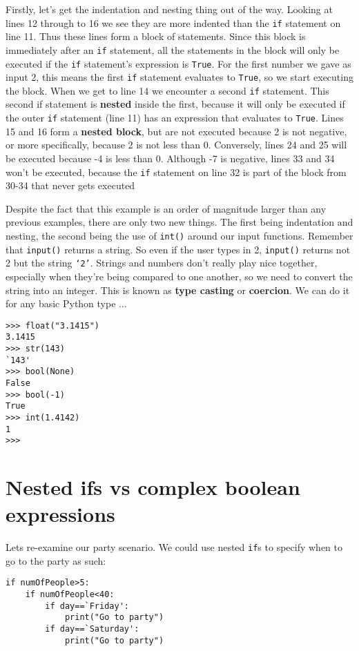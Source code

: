 Firstly, let's get the indentation and nesting thing out of the way.   Looking at lines 12 through to 16 we see they are more indented than   the \texttt{if} statement on line 11. Thus these lines form a block of   statements. Since this block is immediately after an \texttt{if} statement, all   the statements in the block will only be executed if the \texttt{if} statement's   expression is \texttt{True}. For the first number we gave as input 2, this means the first                 \texttt{if} statement evaluates to \texttt{True}, so we start executing the block. When we get to line 14 we   encounter a second \texttt{if} statement. This second if statement is   \textbf{nested} inside the first, because it will only be   executed if the outer \texttt{if} statement (line 11) has an expression that   evaluates to \texttt{True}. Lines 15 and 16 form a \textbf{nested   block}, but are not executed because 2 is not negative, or more   specifically, because 2 is not less than 0. Conversely, lines 24 and 25   will be executed because -4 is less than 0. Although -7 is negative, lines 33 and 34 won't be executed, because the \texttt{if} statement on line 32 is part of the block from 30-34 that never gets executed

Despite the fact that this example is an order of magnitude larger   than any previous examples, there are only two new things. The first   being indentation and nesting, the second being the use of   
\texttt{int()} around our input functions.  Remember that   \texttt{input()} returns a string. So even if the user types in 2,   \texttt{input()} returns not 2 but the string \texttt{`2'}. Strings and numbers don't   really play nice together, especially when they're being compared to   one another, so we need to convert the string into an integer. This is   known as \textbf{type casting} or \textbf{coercion}. We   can do it for any basic Python type ...
\begin{lstlisting}
>>> float("3.1415")
3.1415
>>> str(143)
`143'
>>> bool(None)
False
>>> bool(-1)
True
>>> int(1.4142)
1
>>>
\end{lstlisting}

\section{Nested ifs vs complex boolean expressions}

 Lets re-examine our party scenario. We could use nested \texttt{if}s to specify when to go to the party as such:
\begin{lstlisting}
if numOfPeople>5:
	if numOfPeople<40:
		if day==`Friday':
			print("Go to party")
		if day==`Saturday':
			print("Go to party")
\end{lstlisting}

